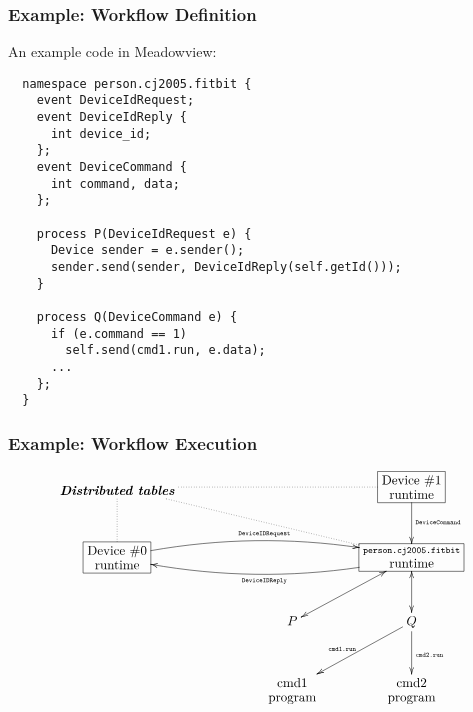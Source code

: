 \documentclass{beamer}
\begin{document}
\begin{frame}[fragile]
\frametitle{Example: Workflow Definition}

An example code in Meadowview:

{\scriptsize
\begin{verbatim}
  namespace person.cj2005.fitbit {
    event DeviceIdRequest;
    event DeviceIdReply { 
      int device_id;
    };
    event DeviceCommand {
      int command, data;
    };

    process P(DeviceIdRequest e) {
      Device sender = e.sender();
      sender.send(sender, DeviceIdReply(self.getId()));
    }

    process Q(DeviceCommand e) {
      if (e.command == 1) 
        self.send(cmd1.run, e.data);
      ...
    };
  }
\end{verbatim}
}

\end{frame}

\begin{frame}[fragile]
\frametitle{Example: Workflow Execution}

{\scriptsize
\[\xymatrix@+0.5pc{
  & \txt{\bf\em Distributed tables} \ar@{.}[rrr]\ar@{.}[d]\ar@{.}[rrrd]
  &&&*+[F]\txt{Device\ \#1\\ runtime} \ar[d]^{\txt{\tiny{}\tt{}DeviceCommand}}&\\ 
 & *+[F]\txt{Device\ \#0\\ runtime}
  \ar@/^3ex/[rrr]^{\txt{\tiny{}\tt{}DeviceIDRequest}}
  \ar@/_3ex/@{<-}[rrr]_{\txt{\tiny{}\tt{}DeviceIDReply}}
   && &
  *+[F]\txt{{\scriptsize\tt{}person.cj2005.fitbit}\\ runtime} \ar@{<->}[d]
  \ar@{<->}[dl]&\\ 
&&  &P &Q \ar[dl]_{\txt{\tiny{}\tt{}cmd1.run}}\ar[d]^{\txt{\tiny{}\tt{}cmd2.run}}\\
&&  &\txt{cmd1 \\ program} &\txt{cmd2\\ program} \\
}\]
}

\end{frame}


%
%






\end{document}
